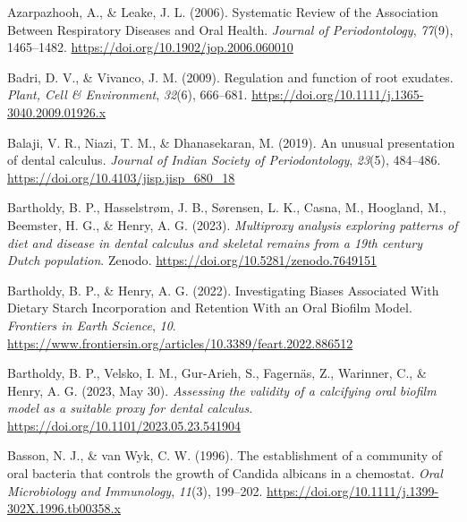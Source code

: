 \documentclass[
  letterpaper,
]{book}
\newlength{\cslhangindent}
\newlength{\cslentryspacingunit} %
\newenvironment{CSLReferences}[2] %
 {%
  \setlength{\parindent}{0pt}
  \ifodd #1
  \let\oldpar\par
  \def\par{\hangindent=\cslhangindent\oldpar}
  \fi
  \setlength{\parskip}{#2\cslentryspacingunit}
 }%
 {}
\begin{document}
\begin{CSLReferences}{1}{0}
\leavevmode{}%
Azarpazhooh, A., \& Leake, J. L. (2006). Systematic {Review} of the
{Association Between Respiratory Diseases} and {Oral Health}.
\emph{Journal of Periodontology}, \emph{77}(9), 1465--1482.
\url{https://doi.org/10.1902/jop.2006.060010}

\leavevmode{}%
Badri, D. V., \& Vivanco, J. M. (2009). Regulation and function of root
exudates. \emph{Plant, Cell \& Environment}, \emph{32}(6), 666--681.
\url{https://doi.org/10.1111/j.1365-3040.2009.01926.x}

\leavevmode{}%
Balaji, V. R., Niazi, T. M., \& Dhanasekaran, M. (2019). An unusual
presentation of dental calculus. \emph{Journal of Indian Society of
Periodontology}, \emph{23}(5), 484--486.
\url{https://doi.org/10.4103/jisp.jisp_680_18}

\leavevmode{}%
Bartholdy, B. P., Hasselstrøm, J. B., Sørensen, L. K., Casna, M.,
Hoogland, M., Beemster, H. G., \& Henry, A. G. (2023). \emph{Multiproxy
analysis exploring patterns of diet and disease in dental calculus and
skeletal remains from a 19th century {Dutch} population}. {Zenodo}.
\url{https://doi.org/10.5281/zenodo.7649151}

\leavevmode{}%
Bartholdy, B. P., \& Henry, A. G. (2022). Investigating {Biases
Associated With Dietary Starch Incorporation} and {Retention With} an
{Oral Biofilm Model}. \emph{Frontiers in Earth Science}, \emph{10}.
\url{https://www.frontiersin.org/articles/10.3389/feart.2022.886512}

\leavevmode{}%
Bartholdy, B. P., Velsko, I. M., Gur-Arieh, S., Fagernäs, Z., Warinner,
C., \& Henry, A. G. (2023, May 30). \emph{Assessing the validity of a
calcifying oral biofilm model as a suitable proxy for dental calculus}.
\url{https://doi.org/10.1101/2023.05.23.541904}

\leavevmode{}%
Basson, N. J., \& van Wyk, C. W. (1996). The establishment of a
community of oral bacteria that controls the growth of {Candida}
albicans in a chemostat. \emph{Oral Microbiology and Immunology},
\emph{11}(3), 199--202.
\url{https://doi.org/10.1111/j.1399-302X.1996.tb00358.x}


\end{CSLReferences}
\end{document}
